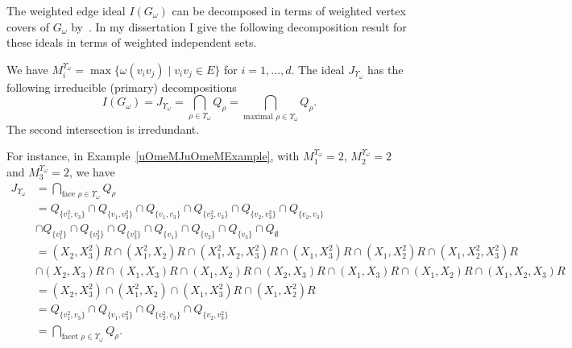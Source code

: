 \documentclass{article}
\begin{document}
    The weighted edge ideal $I(G_\omega)$ can be decomposed in terms of weighted vertex covers of $G_\omega$ by~\cite{MR3055580}. In my dissertation I give the following decomposition result for these ideals in terms of weighted independent sets.
\begin{theorem} \label{wEIDecomInWIAndMIThm}
    We have $M_i^{\Upsilon_\omega} = \max\{\omega(v_iv_j) \mid v_iv_j \in E\}$ for $i = 1,\dots,d$. The ideal $J_{\Upsilon_\omega}$ has the following irreducible (primary) decompositions
    \[I(G_\omega) =  J_{\Upsilon_\omega} = \bigcap_{\rho \in \Upsilon_\omega} Q_\rho = \bigcap_{\text{maximal } \rho \in \Upsilon_\omega} Q_\rho.\]
    The second intersection is irredundant.
\end{theorem}
    For instance, in Example~\ref{uOmeMJuOmeMExample}, with $M_1^{\Upsilon_\omega} = 2$, $M_2^{\Upsilon_\omega} = 2$ and $M_3^{\Upsilon_\omega} = 2$, we have
\begin{align*}
    J_{\Upsilon_\omega} &= \bigcap_{\text{face }\rho \in \Upsilon_\omega}Q_\rho  \\
    &= Q_{\{v_1^2,v_3\}} \cap Q_{\{v_1,v_3^2\}} \cap Q_{\{v_1,v_3\}} \cap Q_{\{v_2^2,v_3\}} \cap Q_{\{v_2,v_3^2\}} \cap Q_{\{v_2,v_3\}} \\
    & \cap Q_{\{v_1^2\}} \cap Q_{\{v_2^2\}} \cap Q_{\{v_3^2\}} \cap Q_{\{v_1\}} \cap Q_{\{v_2\}} \cap Q_{\{v_3\}} \cap Q_{\emptyset} \\
    &= (X_2,X_3^2)R \cap (X_1^2,X_2)R \cap (X_1^2,X_2,X_3^2)R \cap (X_1,X_3^2)R \cap (X_1,X_2^2)R \cap (X_1,X_2^2,X_3^2)R \\
    & \cap (X_2,X_3)R \cap (X_1,X_3)R \cap (X_1,X_2)R \cap (X_2,X_3)R \cap (X_1,X_3)R \cap (X_1,X_2)R \cap (X_1,X_2,X_3)R \\
    &= (X_2,X_3^2) \cap (X_1^2,X_2) \cap (X_1,X_3^2)R \cap (X_1,X_2^2)R \\
    &= Q_{\{v_1^2,v_3\}} \cap Q_{\{v_1,v_3^2\}} \cap Q_{\{v_2^2,v_3\}} \cap Q_{\{v_2,v_3^2\}} \\
    &= \bigcap_{\text{facet }\rho \in \Upsilon_\omega}Q_\rho.
\end{align*}
\end{document}
